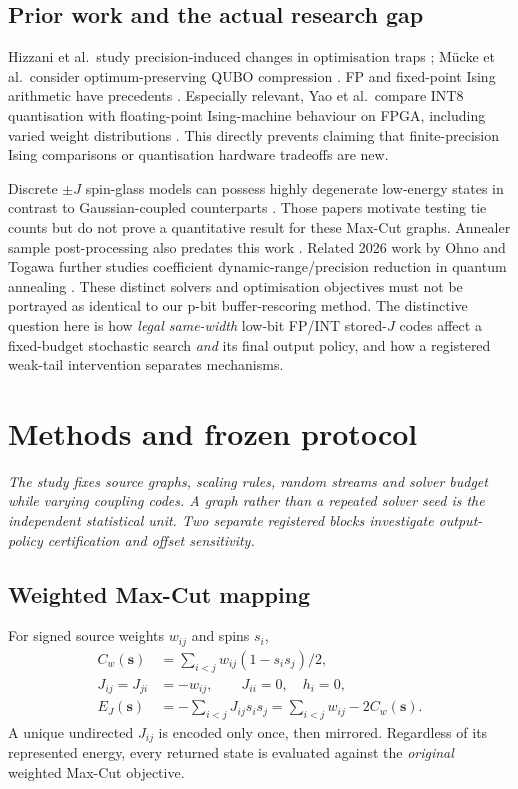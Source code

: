 \documentclass[11pt,a4paper,oneside]{report}
\begin{document}
\section{Prior work and the actual research gap}
Hizzani et al.\ study precision-induced changes in optimisation
traps \cite{PbitHizzani2026}; M\"ucke et al.\ consider
optimum-preserving QUBO compression \cite{PbitMuecke2025}.
FP and fixed-point Ising arithmetic have precedents
\cite{PbitTao2023,S32,S33}. Especially relevant,
Yao et al.\ compare INT8 quantisation with floating-point
Ising-machine behaviour on FPGA, including varied
weight distributions \cite{PbitYao2026}. This directly
prevents claiming that finite-precision Ising comparisons
or quantisation hardware tradeoffs are new.

Discrete $\pm J$ spin-glass models can possess
highly degenerate low-energy states in contrast to
Gaussian-coupled counterparts
\cite{PbitLundowCampbell2016,PbitXu2017}.
Those papers motivate testing tie counts but do
not prove a quantitative result for these Max-Cut graphs.
Annealer sample post-processing also predates this work
\cite{PbitAyanzadeh2021}. Related 2026 work by
Ohno and Togawa further studies coefficient
dynamic-range/precision reduction in quantum
annealing \cite{PbitOhnoTogawa2026}.
These distinct solvers and optimisation objectives
must not be portrayed as identical to our p-bit
buffer-rescoring method. The distinctive question
here is how \emph{legal same-width} low-bit FP/INT stored-$J$
codes affect a fixed-budget stochastic search
\emph{and} its final output policy, and how a
registered weak-tail intervention separates mechanisms.

\chapter{Methods and frozen protocol}
\noindent\emph{The study fixes source graphs, scaling rules,
random streams and solver budget while varying coupling codes.
A graph rather than a repeated solver seed is the independent
statistical unit. Two separate registered blocks investigate
output-policy certification and offset sensitivity.}

\section{Weighted Max-Cut mapping}
For signed source weights $w_{ij}$ and spins $s_i$,
\begin{align}
C_w(\mathbf{s})&=\sum_{i<j}w_{ij}(1-s_i s_j)/2,\\
J_{ij}=J_{ji}&=-w_{ij},\qquad J_{ii}=0,\quad h_i=0,\\
E_J(\mathbf{s})&=-\sum_{i<j}J_{ij}s_i s_j
=\sum_{i<j}w_{ij}-2C_w(\mathbf{s}).
\end{align}
A unique undirected $J_{ij}$ is encoded only once,
then mirrored. Regardless of its represented energy,
every returned state is evaluated against the
\emph{original} weighted Max-Cut objective.
\end{document}
